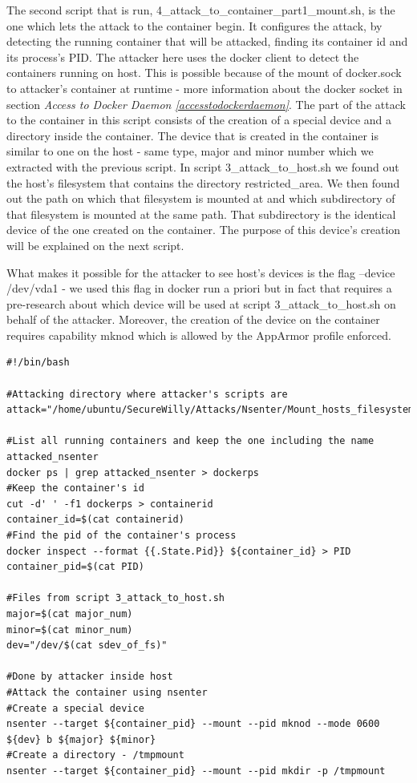 The second script that is run, 4\_attack\_to\_container\_part1\_mount.sh, is the one which lets the attack to the container begin. It configures the attack, by detecting the running container that will be attacked, finding its container id and its process's PID. The attacker here uses the docker client to detect the containers running on host. This is possible because of the mount of docker.sock to attacker's container at runtime - more information about the docker socket in section \textit{Access to Docker Daemon \ref{accesstodockerdaemon}}. The part of the attack to the container in this script consists of the creation of a special device and a directory inside the container. The device that is created in the container is similar to one on the host - same type, major and minor number which we extracted with the previous script. In script 3\_attack\_to\_host.sh we found out the host's filesystem that contains the directory restricted\_area. We then found out the path on which that filesystem is mounted at and which subdirectory of that filesystem is mounted at the same path. That subdirectory is the identical device of the one created on the container. The purpose of this device's creation will be explained on the next script.

What makes it possible for the attacker to see host's devices is the flag --device /dev/vda1 - we used this flag in docker run a priori but in fact that requires a pre-research about which device will be used at script 3\_attack\_to\_host.sh on behalf of the attacker. Moreover, the creation of the device on the container requires capability mknod which is allowed by the AppArmor profile enforced.

\begin{lstlisting}[style=bashscript, caption={4\_attack\_to\_container\_part1\_mount.sh}]
#!/bin/bash

#Attacking directory where attacker's scripts are
attack="/home/ubuntu/SecureWilly/Attacks/Nsenter/Mount_hosts_filesystem"

#List all running containers and keep the one including the name attacked_nsenter
docker ps | grep attacked_nsenter > dockerps
#Keep the container's id
cut -d' ' -f1 dockerps > containerid
container_id=$(cat containerid)
#Find the pid of the container's process
docker inspect --format {{.State.Pid}} ${container_id} > PID
container_pid=$(cat PID)

#Files from script 3_attack_to_host.sh
major=$(cat major_num)
minor=$(cat minor_num)
dev="/dev/$(cat sdev_of_fs)"

#Done by attacker inside host
#Attack the container using nsenter
#Create a special device
nsenter --target ${container_pid} --mount --pid mknod --mode 0600 ${dev} b ${major} ${minor}
#Create a directory - /tmpmount
nsenter --target ${container_pid} --mount --pid mkdir -p /tmpmount
\end{lstlisting}

